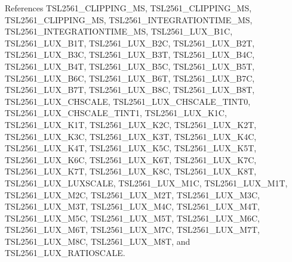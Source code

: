 References T\+S\+L2561\+\_\+\+C\+L\+I\+P\+P\+I\+N\+G\+\_\+MS, T\+S\+L2561\+\_\+\+C\+L\+I\+P\+P\+I\+N\+G\+\_\+MS, T\+S\+L2561\+\_\+\+C\+L\+I\+P\+P\+I\+N\+G\+\_\+MS, T\+S\+L2561\+\_\+\+I\+N\+T\+E\+G\+R\+A\+T\+I\+O\+N\+T\+I\+M\+E\+\_\+MS, T\+S\+L2561\+\_\+\+I\+N\+T\+E\+G\+R\+A\+T\+I\+O\+N\+T\+I\+M\+E\+\_\+MS, T\+S\+L2561\+\_\+\+L\+U\+X\+\_\+\+B1C, T\+S\+L2561\+\_\+\+L\+U\+X\+\_\+\+B1T, T\+S\+L2561\+\_\+\+L\+U\+X\+\_\+\+B2C, T\+S\+L2561\+\_\+\+L\+U\+X\+\_\+\+B2T, T\+S\+L2561\+\_\+\+L\+U\+X\+\_\+\+B3C, T\+S\+L2561\+\_\+\+L\+U\+X\+\_\+\+B3T, T\+S\+L2561\+\_\+\+L\+U\+X\+\_\+\+B4C, T\+S\+L2561\+\_\+\+L\+U\+X\+\_\+\+B4T, T\+S\+L2561\+\_\+\+L\+U\+X\+\_\+\+B5C, T\+S\+L2561\+\_\+\+L\+U\+X\+\_\+\+B5T, T\+S\+L2561\+\_\+\+L\+U\+X\+\_\+\+B6C, T\+S\+L2561\+\_\+\+L\+U\+X\+\_\+\+B6T, T\+S\+L2561\+\_\+\+L\+U\+X\+\_\+\+B7C, T\+S\+L2561\+\_\+\+L\+U\+X\+\_\+\+B7T, T\+S\+L2561\+\_\+\+L\+U\+X\+\_\+\+B8C, T\+S\+L2561\+\_\+\+L\+U\+X\+\_\+\+B8T, T\+S\+L2561\+\_\+\+L\+U\+X\+\_\+\+C\+H\+S\+C\+A\+LE, T\+S\+L2561\+\_\+\+L\+U\+X\+\_\+\+C\+H\+S\+C\+A\+L\+E\+\_\+\+T\+I\+N\+T0, T\+S\+L2561\+\_\+\+L\+U\+X\+\_\+\+C\+H\+S\+C\+A\+L\+E\+\_\+\+T\+I\+N\+T1, T\+S\+L2561\+\_\+\+L\+U\+X\+\_\+\+K1C, T\+S\+L2561\+\_\+\+L\+U\+X\+\_\+\+K1T, T\+S\+L2561\+\_\+\+L\+U\+X\+\_\+\+K2C, T\+S\+L2561\+\_\+\+L\+U\+X\+\_\+\+K2T, T\+S\+L2561\+\_\+\+L\+U\+X\+\_\+\+K3C, T\+S\+L2561\+\_\+\+L\+U\+X\+\_\+\+K3T, T\+S\+L2561\+\_\+\+L\+U\+X\+\_\+\+K4C, T\+S\+L2561\+\_\+\+L\+U\+X\+\_\+\+K4T, T\+S\+L2561\+\_\+\+L\+U\+X\+\_\+\+K5C, T\+S\+L2561\+\_\+\+L\+U\+X\+\_\+\+K5T, T\+S\+L2561\+\_\+\+L\+U\+X\+\_\+\+K6C, T\+S\+L2561\+\_\+\+L\+U\+X\+\_\+\+K6T, T\+S\+L2561\+\_\+\+L\+U\+X\+\_\+\+K7C, T\+S\+L2561\+\_\+\+L\+U\+X\+\_\+\+K7T, T\+S\+L2561\+\_\+\+L\+U\+X\+\_\+\+K8C, T\+S\+L2561\+\_\+\+L\+U\+X\+\_\+\+K8T, T\+S\+L2561\+\_\+\+L\+U\+X\+\_\+\+L\+U\+X\+S\+C\+A\+LE, T\+S\+L2561\+\_\+\+L\+U\+X\+\_\+\+M1C, T\+S\+L2561\+\_\+\+L\+U\+X\+\_\+\+M1T, T\+S\+L2561\+\_\+\+L\+U\+X\+\_\+\+M2C, T\+S\+L2561\+\_\+\+L\+U\+X\+\_\+\+M2T, T\+S\+L2561\+\_\+\+L\+U\+X\+\_\+\+M3C, T\+S\+L2561\+\_\+\+L\+U\+X\+\_\+\+M3T, T\+S\+L2561\+\_\+\+L\+U\+X\+\_\+\+M4C, T\+S\+L2561\+\_\+\+L\+U\+X\+\_\+\+M4T, T\+S\+L2561\+\_\+\+L\+U\+X\+\_\+\+M5C, T\+S\+L2561\+\_\+\+L\+U\+X\+\_\+\+M5T, T\+S\+L2561\+\_\+\+L\+U\+X\+\_\+\+M6C, T\+S\+L2561\+\_\+\+L\+U\+X\+\_\+\+M6T, T\+S\+L2561\+\_\+\+L\+U\+X\+\_\+\+M7C, T\+S\+L2561\+\_\+\+L\+U\+X\+\_\+\+M7T, T\+S\+L2561\+\_\+\+L\+U\+X\+\_\+\+M8C, T\+S\+L2561\+\_\+\+L\+U\+X\+\_\+\+M8T, and T\+S\+L2561\+\_\+\+L\+U\+X\+\_\+\+R\+A\+T\+I\+O\+S\+C\+A\+LE.



